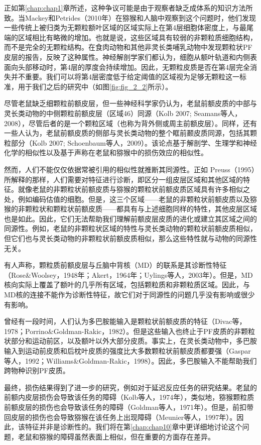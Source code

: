 正如第\ref{chap:chap1}章所述，这种争议可能是由于观察者缺乏成体系的知识方法所致。当Mackey和Petrides（2010年）在猕猴和人脑中观察到这个问题时，他们发现一些传统上被归类为无颗粒额叶区域的区域实际上在第4层细胞体密度上，与最尾端的区域相比有略微的增加。也就是说，这些区域具有较弱的非颗粒质细胞结构，而不是完全的无颗粒结构。在食肉动物和其他非灵长类哺乳动物中发现颗粒状PF皮层的报告，反映了这种属性。神经解剖学家们都认为，细胞从额叶轨道和内侧表面向头部移动时，第4层的厚度会持续增加。因此，无颗粒皮质是否在第4层完全消失并不重要。我们可以将第4层密度低于给定阈值的区域视为足够无颗粒这一标准，用于我们之后的研究中（如图\ref{fig:fig_2_2}所示）。

尽管老鼠缺乏细颗粒前额皮层，但一些神经科学家仍认为，老鼠前额皮质的中部与灵长类动物的中侧颗粒前额皮层（区域46）同源（Kolb 2007; Seamans等人，2008），尽管后者的是一个颗粒区域（也称为背外侧或周主前额皮层）。同样，还有一些人认为，老鼠前额皮质的侧部与灵长类动物的整个眶前颞皮质同源，包括其颗粒部分（Kolb 2007; Schoenbaum等人，2009）。该论点基于解剖学、生理学和神经化学的相似性以及基于声称在老鼠和猕猴中的损伤效应的相似性。

然而，人们不能仅仅依据常被引用的相似性就推断其同源性。正如 Preuss（1995）所解释的那样，人们需要对特征进行诊断，即区分一组皮层区域和其他区域的特征。就像老鼠的非颗粒状前额皮质与猕猴的颗粒状前额皮质区域具有许多相似之处，例如编码估值的细胞。但是，这三个区域——老鼠的非颗粒状前额皮质以及猕猴的非颗粒状和颗粒状前额皮质——都具有与上述细胞同样的特性，其他皮层区域也是如此。因此，它们无法帮助我们理解前额皮层皮质的进化或建立其区域之间的同源性。例如，老鼠的非颗粒状区域的特性与灵长类动物的颗粒状前额皮质相似，但它们也与灵长类动物的非颗粒状前额皮质相似，那么这些特性就与动物的同源性无关。

有人声称，颗粒质前额皮层与丘脑中背核（MD）的联系是其诊断性特征（Rose\&Woolsey，1948年；Akert，1964年；Uylings等人，2003年）。但是，MD核向实际上覆盖了额叶的几乎所有区域，包括颗粒质和非颗粒质区域。因此，与MD核的连接不能作为诊断性特征，故它们对于同源性的问题几乎没有影响或很少有影响。

曾经有一段时间，人们认为多巴胺能输入是颗粒状前额皮质的特征（Divac等，1978；Porrino\&Goldman-Rakic，1982）。但是这些输入也终止于PF皮质的非颗粒状部分和运动前区，以及额叶以外大部分皮质。事实上，在灵长类动物中，多巴胺输入到运动前皮质和后枕叶皮质的强度比大多数颗粒状前额皮质都要强（Gaspar等人，1992；Williams\&Goldman-Rakic，1998）。因此，多巴胺输入不能帮助我们跨物种识别PF皮质。

最终，损伤结果得到了进一步的研究，例如对于延迟反应任务的研究结果。老鼠的前额内皮层损伤会导致该任务的障碍（Kolb等人，1974年），类似地，猕猴颗粒质前额皮层的损伤也会导致该任务的障碍（Goldman等人，1971年）。但是，前扣带回皮层的损伤也会导致猕猴在该任务上出现障碍（Meunier等人，1997年）。因此，该特征并非是诊断性的。我们将在第\ref{chap:chap10}章中更详细地讨论这个问题，老鼠和猕猴的障碍虽然表面上相似，但在重要的方面存在差异。

